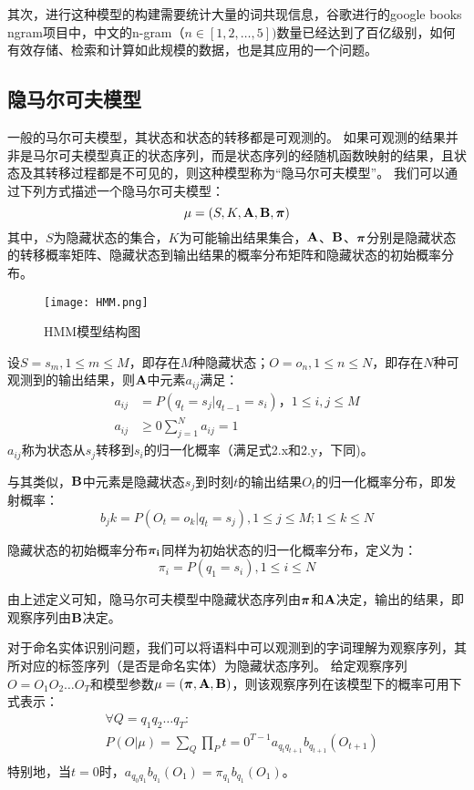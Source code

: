 其次，进行这种模型的构建需要统计大量的词共现信息，谷歌进行的google books ngram项目中，中文的n-gram（$n\in[1, 2, \dots, 5])$数量已经达到了百亿级别，如何有效存储、检索和计算如此规模的数据，也是其应用的一个问题。
\subsection{隐马尔可夫模型}
一般的马尔可夫模型，其状态和状态的转移都是可观测的。
如果可观测的结果并非是马尔可夫模型真正的状态序列，而是状态序列的经随机函数映射的结果，且状态及其转移过程都是不可见的，则这种模型称为“隐马尔可夫模型”。
我们可以通过下列方式描述一个隐马尔可夫模型：
\begin{equation}
    \mu =(S, K, \boldsymbol{\mathbf{A}}, \boldsymbol{\mathbf{B}}, \boldsymbol{\mathbf{\pi}})
\end{equation}
其中，$S$为隐藏状态的集合，$K$为可能输出结果集合，$\boldsymbol{\mathbf{A}}$、$\boldsymbol{\mathbf{B}}$、$\boldsymbol{\mathbf{\pi}}$分别是隐藏状态的转移概率矩阵、隐藏状态到输出结果的概率分布矩阵和隐藏状态的初始概率分布。
\begin{figure}[!htbp]
    \centering
    \texttt{[image: HMM.png]}
    \caption{HMM模型结构图}
    \label{fig:HMM}
\end{figure}
设$S={s_m}, 1\leq m \leq M$，即存在$M$种隐藏状态；$O={o_n}, 1\leq n\leq N$，即存在$N$种可观测到的输出结果，则$\boldsymbol{\mathbf{A}}$中元素$a_{ij}$满足：
\begin{align}
    a_{ij} &= P(q_t = s_j|q_{t-1} = s_i)， 1\leq i,j \leq M\\
    a_{ij} &\geq 0
    \sum^{N}_{j=1}a_{ij} = 1
\end{align}
$a_{ij}$称为状态从$s_j$转移到$s_i$的归一化概率（满足式2.x和2.y，下同)。

与其类似，$\boldsymbol{\mathbf{B}}$中元素是隐藏状态$s_j$到时刻$t$的输出结果$O_t$的归一化概率分布，即发射概率：
\begin{equation}
    b_j{k} = P(O_t = o_k |q_t = s_j), 1\leq j \leq M; 1\leq k\leq N
\end{equation}

隐藏状态的初始概率分布$\boldsymbol{\mathbf{\pi_i}}$同样为初始状态的归一化概率分布，定义为：
\begin{equation}
    \pi_i = P(q_1 = s_i), 1\leq i \leq N
\end{equation}

由上述定义可知，隐马尔可夫模型中隐藏状态序列由$\boldsymbol{\mathbf{\pi}}$和$\boldsymbol{\mathbf{A}}$决定，输出的结果，即观察序列由$\boldsymbol{\mathbf{B}}$决定。

对于命名实体识别问题，我们可以将语料中可以观测到的字词理解为观察序列，其所对应的标签序列（是否是命名实体）为隐藏状态序列。
给定观察序列$O = O_1 O_2\dots O_T$和模型参数$\mu = (\boldsymbol{\mathbf{\pi}},\boldsymbol{\mathbf{A}},\boldsymbol{\mathbf{B}})$，则该观察序列在该模型下的概率可用下式表示：
\begin{align}
    &\forall Q = q_1 q_2 \dots q_T:\\
    &P(O|\mu) = \sum_Q \prod_P{t=0}^{T-1}a_{q_t q_{t+1}}b_{q_{t+1}}(O_{t+1})
    \label{eq:HMM-conditional-probability}\\
\end{align}
特别地，当$t=0$时，$a_{q_0 q_1}b_{q_1}(O_1) = \pi_{q_1}b_{q_1}(O_1)$。

